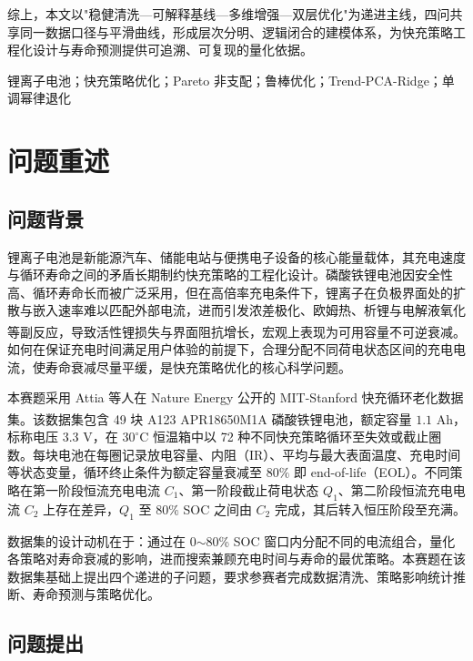 \documentclass[12pt,a4paper]{article}
\newcommand{\keywordfont}{\fontsize{12pt}{16pt}\selectfont\heiti\bfseries}
\newcommand{\paperstrong}[1]{{\heiti #1}}
\newcommand{\supercite}[1]{\textsuperscript{\cite{#1}}}
\begin{document}
\indent 综上，本文以"稳健清洗—可解释基线—多维增强—双层优化"为递进主线，四问共享同一数据口径与平滑曲线，形成层次分明、逻辑闭合的建模体系，为快充策略工程化设计与寿命预测提供可追溯、可复现的量化依据。

\indent {\keywordfont \paperstrong{关键词：}} \paperstrong{锂离子电池}；\paperstrong{快充策略优化}；\paperstrong{Pareto 非支配}；\paperstrong{鲁棒优化}；\paperstrong{Trend-PCA-Ridge}；\paperstrong{单调幂律退化}\label{abstract:end}

\newpage

\section{问题重述}

\subsection{问题背景}

锂离子电池是新能源汽车、储能电站与便携电子设备的核心能量载体，其充电速度与循环寿命之间的矛盾长期制约快充策略的工程化设计。磷酸铁锂电池因安全性高、循环寿命长而被广泛采用，但在高倍率充电条件下，锂离子在负极界面处的扩散与嵌入速率难以匹配外部电流，进而引发浓差极化、欧姆热、析锂与电解液氧化等副反应，导致活性锂损失与界面阻抗增长，宏观上表现为可用容量不可逆衰减\supercite{ref12,ref13}。如何在保证充电时间满足用户体验的前提下，合理分配不同荷电状态区间的充电电流，使寿命衰减尽量平缓，是快充策略优化的核心科学问题。

本赛题采用 Attia 等人在 Nature Energy 公开的 MIT-Stanford 快充循环老化数据集\supercite{ref8}。该数据集包含 49 块 A123 APR18650M1A 磷酸铁锂电池，额定容量 $1.1$ Ah，标称电压 $3.3$ V，在 $30^\circ$C 恒温箱中以 72 种不同快充策略循环至失效或截止圈数。每块电池在每圈记录放电容量、内阻（IR）、平均与最大表面温度、充电时间等状态变量，循环终止条件为额定容量衰减至 $80\%$ 即 end-of-life（EOL）。不同策略在第一阶段恒流充电电流 $C_1$、第一阶段截止荷电状态 $Q_1$、第二阶段恒流充电电流 $C_2$ 上存在差异，$Q_1$ 至 $80\%$ SOC 之间由 $C_2$ 完成，其后转入恒压阶段至充满。

数据集的设计动机在于：通过在 0$\sim$80\% SOC 窗口内分配不同的电流组合，量化各策略对寿命衰减的影响，进而搜索兼顾充电时间与寿命的最优策略。本赛题在该数据集基础上提出四个递进的子问题，要求参赛者完成数据清洗、策略影响统计推断、寿命预测与策略优化。

\subsection{问题提出}
\end{document}
